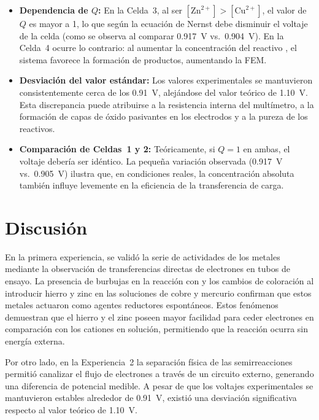 \documentclass[12pt]{article}
\begin{document}
\begin{itemize}
    \item \textbf{Dependencia de $Q$:} En la Celda~3, al ser
          $[\text{Zn}^{2+}] > [\text{Cu}^{2+}]$, el valor de $Q$ es mayor a
          1, lo que según la ecuación de Nernst debe disminuir el voltaje de
          la celda (como se observa al comparar 0.917~V vs.\ 0.904~V). En la
          Celda~4 ocurre lo contrario: al aumentar la concentración del
          reactivo , el sistema favorece la formación de
          productos, aumentando la FEM.

    \item \textbf{Desviación del valor estándar:} Los valores experimentales
          se mantuvieron consistentemente cerca de los 0.91~V, alejándose del
          valor teórico de 1.10~V. Esta discrepancia puede atribuirse a la
          resistencia interna del multímetro, a la formación de capas de
          óxido pasivantes en los electrodos y a la pureza de los reactivos.

    \item \textbf{Comparación de Celdas~1 y 2:} Teóricamente, si $Q = 1$ en
          ambas, el voltaje debería ser idéntico. La pequeña variación
          observada (0.917~V vs.\ 0.905~V) ilustra que, en condiciones
          reales, la concentración absoluta también influye levemente en la
          eficiencia de la transferencia de carga.
\end{itemize}

\section{Discusión}

En la primera experiencia, se validó la serie de actividades de los metales
mediante la observación de transferencias directas de electrones en tubos de
ensayo. La presencia de burbujas en la reacción con  y los cambios
de coloración al introducir hierro y zinc en las soluciones de cobre y mercurio
confirman que estos metales actuaron como agentes reductores espontáneos. Estos
fenómenos demuestran que el hierro y el zinc poseen mayor facilidad para ceder
electrones en comparación con los cationes en solución, permitiendo que la
reacción ocurra sin energía externa.

Por otro lado, en la Experiencia~2 la separación física de las semirreacciones
permitió canalizar el flujo de electrones a través de un circuito externo,
generando una diferencia de potencial medible. A pesar de que los voltajes
experimentales se mantuvieron estables alrededor de 0.91~V, existió una
desviación significativa respecto al valor teórico de 1.10~V.
\end{document}

